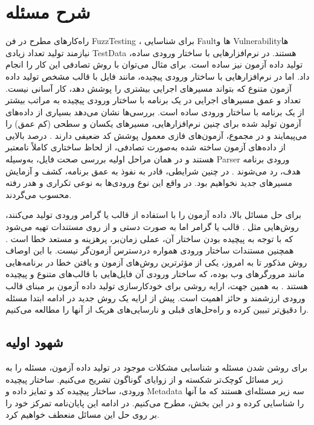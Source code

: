    
\section{شرح مسئله}\label{problem_statement}
راه‌کارهای مطرح در فن \gls{FuzzTesting}
\cite{Miller:1990:ESR:96267.96279,Miller1995,Forrester:2000:ESR:1267102.1267108,Miller:2006:ESR:1145735.1145743}،
برای شناسایی \gls{Fault}ها  و \gls{Vulnerability}‌ها  نیازمند تولید تعداد زیادی \gls{TestData} هستند. در نرم‌افزارهایی با ساختار ورودی ساده، تولید داده آزمون نیز ساده است. برای مثال می‌توان با روش تصادفی این کار را انجام داد. اما در نرم‌افزارهایی با ساختار ورودی پیچیده، مانند فایل با قالب مشخص تولید داده آزمون متنوع که بتواند مسیرهای اجرایی بیشتری را پوشش دهد، کار آسانی نیست. تعداد و عمق مسیرهای اجرایی در یک برنامه با ساختار ورودی پیچیده به مراتب بیشتر از یک برنامه با ساختار ورودی ساده است. بررسی‌ها نشان می‌دهد بسیاری از داده‌های آزمون تولید شده برای چنین نرم‌افزارهایی، مسیرهای یکسان و سطحی (کم عمق) را می‌پیمایند
\cite{Rawat2017VUzzerAE}
و در مجموع، آزمون‌های فازی معمول پوشش کد ضعیفی دارند
\cite{Kargen:2015:TPA:2786805.2786844}.
درصد بالایی از داده‌های آزمون ساخته شده به‌صورت تصادفی، از لحاظ ساختاری کاملاً نامعتبر هستند و در همان مراحل اولیه بررسی صحت فایل، به‌وسیله \gls{Parser} ورودی برنامه هدف، رد می‌شوند
\cite{10.1007/978-3-319-45744-4_29, Rawat2017VUzzerAE}.
در چنین شرایطی، قادر به نفوذ به عمق برنامه، کشف و آزمایش مسیرهای جدید نخواهیم بود. در واقع این نوع ورودی‌ها به نوعی تکراری و هدر رفته محسوب می‌گردند.


برای حل مسائل بالا، داده آزمون را با استفاده از قالب یا گرامر ورودی تولید می‌کنند، روش‌هایی مثل 
\cite{Godefroid:2012:SWF:2090147.2094081}
. قالب یا گرامر اما به صورت دستی و از روی مستندات تهیه می‌شود که با توجه به پیچیده بودن ساختار آن، عملی زمان‌بر، پرهزینه و مستعد خطا است
\cite{Godefroid:2017:LML:3155562.3155573}.
همچنین مستندات ساختار ورودی همواره دردسترس آزمون‌گر نیست. با این اوصاف روش مذکور تا به امروز، یکی از مؤثرترین روش‌های آزمون و یافتن خطا در برنامه‌هایی مانند مرورگرهای وب بوده، که ساختار ورودی آن فایل‌هایی با قالب‌های متنوع و پیچیده هستند
\cite{Godefroid:2017:LML:3155562.3155573, Kettunen2014}.
به همین جهت، ارایه روشی برای خودکارسازی تولید داده آزمون بر مبنای قالب ورودی ارزشمند و حائز اهمیت است. پیش از ارایه یک روش جدید در ادامه ابتدا مسئله را دقیق‌تر تبیین کرده و راه‌حل‌های قبلی و نارسایی‌های هریک از آنها را مطالعه می‌کنیم.


\subsection{شهود اولیه}\label{intuition}
برای روشن شدن مسئله و شناسایی مشکلات موجود در تولید داده آزمون، مسئله را به زیر مسائل کوچک‌تر شکسته و از زوایای گوناگون تشریح می‌کنیم. ساختار پیچیده ورودی، ساختار پیچیده کد و تمایز داده و \gls{Metadata} سه زیر مسئله‌ای هستند که ما آنها را شناسایی کرده و در این بخش، مطرح می‌کنیم. در ادامه این پایان‌نامه تمرکز خود را بر روی حل این مسائل منعطف خواهیم کرد.


